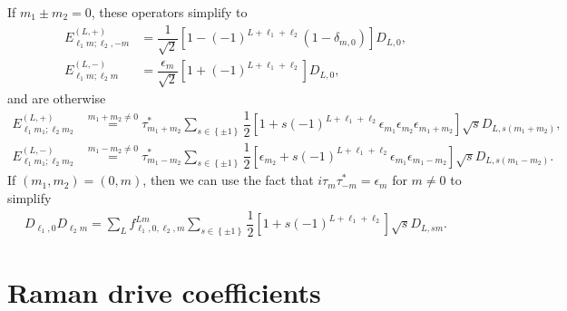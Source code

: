 \documentclass[nofootinbib,notitlepage,11pt]{revtex4-2}
\newcommand{\f}[2]{\dfrac{#1}{#2}} %
\newcommand{\p}[1]{\left(#1\right)} %
\renewcommand{\sp}[1]{\left[#1\right]} %
\renewcommand{\set}[1]{\left\{#1\right\}} %
\newcommand{\1}{\mathds{1}}
\begin{document}
If $m_1\pm m_2=0$, these operators simplify to
\begin{align}
  E_{\ell_1 m;\ell_2,-m}^{(L,+)}
  &= \f1{\sqrt{2}} \sp{1 - \p{-1}^{L+\ell_1+\ell_2}
    \p{1-\delta_{m,0}}} D_{L,0}, \\
  E_{\ell_1 m;\ell_2 m}^{(L,-)}
  &= \f{\epsilon_m}{\sqrt{2}}
  \sp{1 + \p{-1}^{L+\ell_1+\ell_2}} D_{L,0},
\end{align}
and are otherwise
\begin{align}
  E_{\ell_1 m_1;\ell_2 m_2}^{(L,+)}
  &\stackrel{m_1+m_2\ne0}{=}
  \tau_{m_1+m_2}^* \sum_{s\in\set{\pm1}}
  \f12 \sp{1 + s \p{-1}^{L+\ell_1+\ell_2}
    \epsilon_{m_1} \epsilon_{m_2} \epsilon_{m_1+m_2}}
  \sqrt{s} D_{L,s\p{m_1+m_2}}, \\
  E_{\ell_1 m_1;\ell_2 m_2}^{(L,-)}
  &\stackrel{m_1-m_2\ne0}{=}
  \tau_{m_1-m_2}^* \sum_{s\in\set{\pm1}}
  \f12 \sp{\epsilon_{m_2} + s \p{-1}^{L+\ell_1+\ell_2}
    \epsilon_{m_1} \epsilon_{m_1-m_2}}
  \sqrt{s} D_{L,s\p{m_1-m_2}}.
\end{align}
If $\p{m_1,m_2}=\p{0,m}$, then we can use the fact that
$i\tau_m\tau_{-m}^*=\epsilon_m$ for $m\ne0$ to simplify
\begin{align}
  D_{\ell_1,0} D_{\ell_2 m}
  = \sum_L f_{\ell_1,0,\ell_2,m}^{Lm}
  \sum_{s\in\set{\pm1}} \f12 \sp{1 + s \p{-1}^{L+\ell_1+\ell_2}}
  \sqrt{s} D_{L,sm}.
\end{align}

\section{Raman drive coefficients}
\label{sec:drive_raman_coeff}
\end{document}
